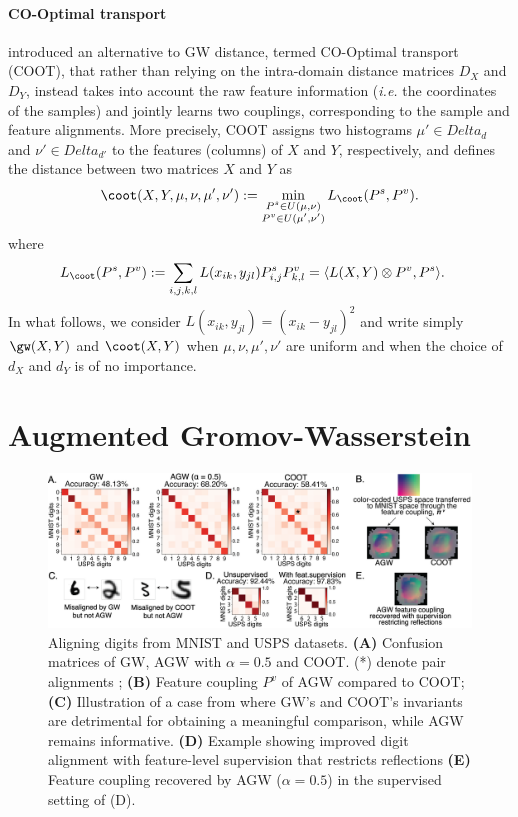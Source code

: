 \paragraph{CO-Optimal transport}
\citep{Redko20} introduced an alternative to GW distance, termed CO-Optimal transport (COOT),
that rather than relying on the intra-domain distance matrices $D_X$ and $D_Y$,
instead takes into account the raw feature information
(\textit{i.e.} the coordinates of the samples) and jointly learns two couplings,
corresponding to the sample and feature alignments. More precisely,
COOT assigns two histograms $\mu' \in Delta_d$ and $\nu' \in Delta_{d'}$ to the
features (columns) of $X$ and $Y$, respectively, and defines the distance between two matrices
$X$ and $Y$ as
\begin{equation*}
  \label{eq:co-optimal-transport}
 \begin{split}
     \coot(X, Y, \mu, \nu, \mu', \nu') :=
     \min_{\substack{P^s \in U(\mu,\nu) \\ P^v \in U(\mu',\nu')}} L_{\coot} (P^s, P^v).
    \end{split}
 \end{equation*}
where
\begin{align*}
    L_\coot (P^s, P^v) &:=  \sum_{i,j,k,l} L(x_{ik},y_{jl})P^s_{i,j} P^v_{k,l}
    =\langle L(X,Y) \otimes P^v,  P^s \rangle.
\end{align*}
In what follows, we consider $L(x_{ik}, y_{jl}) = (x_{ik} - y_{jl})^2$ and write simply
$\gw(X, Y)$ and $\coot(X, Y)$ when $\mu, \nu, \mu', \nu'$
are uniform and when the choice of $d_X$ and $d_Y$ is of no importance.

\section{Augmented Gromov-Wasserstein}

\begin{figure}[t]
\centering
\includegraphics[width=\linewidth]{./Chapitre5/fig//mnist1_supervised.png}
\caption{Aligning digits from MNIST and USPS datasets. \textbf{(A)}
Confusion matrices of GW, AGW with $\alpha=0.5$ and COOT.
(*) denote pair alignments ;
\textbf{(B)} Feature coupling $P^v$ of AGW compared to COOT;
\textbf{(C)} Illustration of a case from where GW's and COOT's invariants are
detrimental for obtaining a meaningful comparison, while AGW remains informative.
\textbf{(D)} Example showing improved digit alignment with feature-level supervision
that restricts reflections \textbf{(E)} Feature coupling recovered by AGW ($\alpha =0.5$)
in the supervised setting of (D).}
\label{fig:mnist}
\end{figure}

